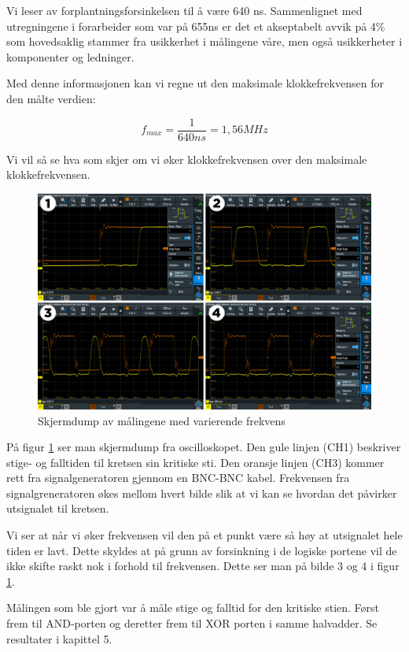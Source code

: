 \documentclass{article}
\begin{document}
Vi leser av forplantningsforsinkelsen til å være 640 ns. Sammenlignet med utregningene i forarbeider som var på 655ns er det et akseptabelt avvik på 4\% som hovedsaklig stammer fra usikkerhet i målingene våre, men også usikkerheter i komponenter og ledninger.

Med denne informasjonen kan vi regne ut den maksimale klokkefrekvensen for den målte verdien:

\begin{equation}
	f_{max} = \frac{1}{640ns} = 1,56 MHz
\end{equation}

Vi vil så se hva som skjer om vi øker klokkefrekvensen over den maksimale klokkefrekvensen.

\begin{figure}[H]
	\centering
	\includegraphics[width=1\linewidth]{tegneserie1}
	\caption{Skjermdump av målingene med varierende frekvens}
	\label{fig:tegneserie1}
\end{figure}

På figur \ref{fig:tegneserie1} ser man skjermdump fra oscilloskopet. Den gule linjen (CH1) beskriver stige- og falltiden til kretsen sin kritiske sti. Den oransje linjen (CH3) kommer rett fra signalgeneratoren gjennom en BNC-BNC kabel. Frekvensen fra signalgreneratoren økes mellom hvert bilde slik at vi kan se hvordan det påvirker utsignalet til kretsen.

Vi ser at når vi øker frekvensen vil den på et punkt være så høy at utsignalet hele tiden er lavt. Dette skyldes at på grunn av forsinkning i de logiske portene vil de ikke skifte raskt nok i forhold til frekvensen. Dette ser man på bilde 3 og 4 i figur \ref{fig:tegneserie1}.

Målingen som ble gjort var å måle stige og falltid for den kritiske stien. Først frem til AND-porten og deretter frem til XOR porten i samme halvadder. Se resultater i kapittel 5.
\end{document}
